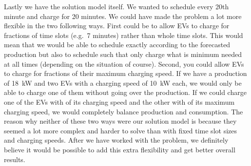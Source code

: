 Lastly we have the solution model itself. We wanted to schedule every 20th minute and charge for 20 minutes. We could have made the problem a lot more flexible in the two following ways. First could be to allow EVs to charge for fractions of time slots (e.g.\ 7 minutes) rather than whole time slots. This would mean that we would be able to schedule exactly according to the forecasted production but also to schedule such that only charge what is minimum needed at all times (depending on the situation of course). Second, you could allow EVs to charge for fractions of their maximum charging speed. If we have a production of \SI{18}{\kilo\watt} and two EVs with a charging speed of \SI{10}{\kilo\watt} each, we would only be able to charge one of them without going over the production. If we could charge one of the EVs with  of its charging speed and the other with  of its maximum charging speed, we would completely balance production and consumption. The reason why neither of these two ways were our solution model is because they seemed a lot more complex and harder to solve than with fixed time slot sizes and charging speeds. After we have worked with the problem, we definitely believe it would be possible to add this extra flexibility and get better overall results. 
